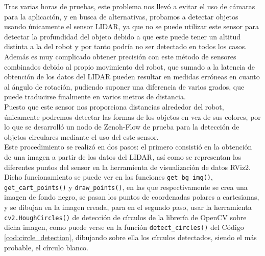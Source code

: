 Tras varias horas de pruebas, este problema nos llevó a evitar el uso de cámaras
para la aplicación, y en busca de alternativas, probamos a detectar objetos
usando únicamente el sensor LIDAR, ya que no se puede utilizar este sensor para
detectar la profundidad del objeto debido a que este puede tener un altitud
distinta a la del robot y por tanto podría no ser detectado en todos los casos.
Además es muy complicado obtener precisión con este método de sensores
combinados debido al propio movimiento del robot, que sumado a la latencia de
obtención de los datos del LIDAR pueden resultar en medidas erróneas en cuanto
al ángulo de rotación, pudiendo suponer una diferencia de varios grados, que
puede traducirse finalmente en varios metros de distancia.
\\

Puesto que este sensor nos proporciona distancias alrededor del robot,
únicamente podremos detectar las formas de los objetos en vez de sus colores,
por lo que se desarrolló un nodo de Zenoh-Flow de prueba para la detección de
objetos circulares mediante el uso del este sensor.
\\

Este procedimiento se realizó en dos pasos: el primero consistió en la obtención
de una imagen a partir de los datos del LIDAR, así como se representan los
diferentes puntos del sensor en la herramienta de visualización de datos RViz2.
Dicho funcionamiento se puede ver en las funciones \verb|get_bg_img()|,
\verb|get_cart_points()| y \verb|draw_points()|, en las que respectivamente se
crea una imagen de fondo negro, se pasan los puntos de coordenadas polares a
cartesianas, y se dibujan en la imagen creada, para en el segundo paso, usar la
herramienta \verb|cv2.HoughCircles()| de detección de círculos de la librería de
OpenCV sobre dicha imagen, como puede verse en la función
\verb|detect_circles()| del Código \ref{cod:circle_detection}, dibujando sobre
ella los círculos detectados, siendo el más probable, el círculo blanco.
\\

